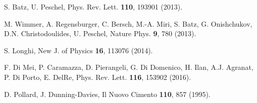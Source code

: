 \documentclass[pra,twocolumn,showpacs,preprintnumbers,amsmath,amssymb]{revtex4}
\begin{document}
\begin{thebibliography}{99}



S. Batz, U. Peschel, Phys. Rev. Lett. \textbf{110}, 193901 (2013).

M. Wimmer, A. Regensburger, C. Bersch, M.-A. Miri, S. Batz, G. Onishchukov, D.N. Christodoulides, U. Peschel,
Nature Phys. \textbf{9}, 780 (2013).

S. Longhi,
New J. of Physics {\bf 16}, 113076 (2014).

F. Di Mei, P. Caramazza, D. Pierangeli, G. Di Domenico, H. Ilan, A.J. Agranat, P. Di Porto, E. DelRe,
Phys. Rev. Lett. \textbf{116}, 153902 (2016).

D. Pollard, J. Dunning-Davies,
Il Nuovo Cimento {\bf 110}, 857 (1995).




\end{thebibliography}
\end{document}
